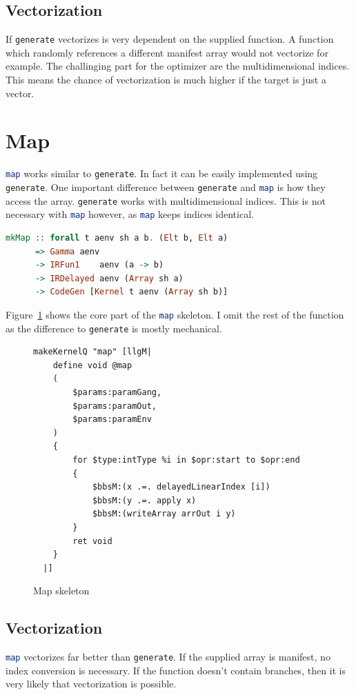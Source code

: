\documentclass[a4paper,bibliography=totocnumbered,parskip,headsepline]{scrbook}
\begin{document}
\subsection*{Vectorization}
If \lstinline[language=haskell]!generate! vectorizes is very dependent on the supplied function.
A function which randomly references a different manifest array would not vectorize for example.
The challinging part for the optimizer are the multidimensional indices.
This means the chance of vectorization is much higher if the target is just a vector.

\section{Map}
\lstinline[language=haskell]!map! works similar to \lstinline[language=haskell]!generate!.
In fact it can be easily implemented using \lstinline[language=haskell]!generate!.
One important difference between \lstinline[language=haskell]!generate! and \lstinline[language=haskell]!map! is how they access the array.
\lstinline[language=haskell]!generate! works with multidimensional indices.
This is not necessary with \lstinline[language=haskell]!map! however, as \lstinline[language=haskell]!map! keeps indices identical.

\begin{lstlisting}[language=haskell]
mkMap :: forall t aenv sh a b. (Elt b, Elt a)
      => Gamma aenv
      -> IRFun1    aenv (a -> b)
      -> IRDelayed aenv (Array sh a)
      -> CodeGen [Kernel t aenv (Array sh b)]
\end{lstlisting}
Figure~\ref{fig:mapskel} shows the core part of the \lstinline[language=haskell]!map! skeleton.
I omit the rest of the function as the difference to \lstinline[language=haskell]!generate! is mostly mechanical.
\begin{figure}
\begin{lstlisting}
makeKernelQ "map" [llgM|
    define void @map
    (
        $params:paramGang,
        $params:paramOut,
        $params:paramEnv
    )
    {
        for $type:intType %i in $opr:start to $opr:end
        {
            $bbsM:(x .=. delayedLinearIndex [i])
            $bbsM:(y .=. apply x)
            $bbsM:(writeArray arrOut i y)
        }
        ret void
    }
  |]
\end{lstlisting}
\caption{Map skeleton}
\label{fig:mapskel}
\end{figure}

\subsection*{Vectorization}
\lstinline[language=haskell]!map! vectorizes far better than \lstinline[language=haskell]!generate!.
If the supplied array is manifest, no index conversion is necessary.
If the function doesn't contain branches, then it is very likely that vectorization is possible.
\end{document}
